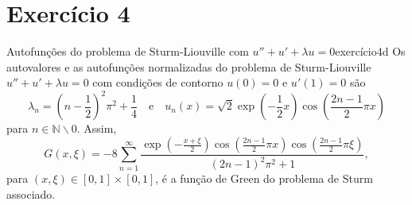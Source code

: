 \section*{Exercício 4}
\begin{proposition}{Autofunções do problema de Sturm-Liouville com \(u'' + u' + \lambda u = 0\)}{exercício4d}
    Os autovalores e as autofunções normalizadas do problema de Sturm-Liouville \(u'' + u' + \lambda u = 0\) com condições de contorno \(u(0) = 0\) e \(u'(1) = 0\) são
    \begin{equation*}
        \lambda_n =\left(n - \frac12\right)^2 \pi^2 + \frac14
        \quad\text{e}\quad
        u_n(x) =\sqrt{2} \exp\left(-\frac{1}{2}x\right)\cos\left(\frac{2n - 1}{2}\pi x\right)
    \end{equation*}
    para \(n \in \mathbb{N}\smallsetminus{0}\). Assim,
    \begin{equation*}
        G(x,\xi) = - 8 \sum_{n = 1}^\infty \frac{\exp\left(-\frac{x + \xi}{2}\right)\cos\left(\frac{2n - 1}{2} \pi x\right)\cos\left(\frac{2n - 1}{2} \pi \xi\right)}{\left(2n - 1\right)^2\pi^2 + 1},
    \end{equation*}
    para \((x,\xi) \in [0,1]\times[0,1]\), é a função de Green do problema de Sturm associado.
\end{proposition}
